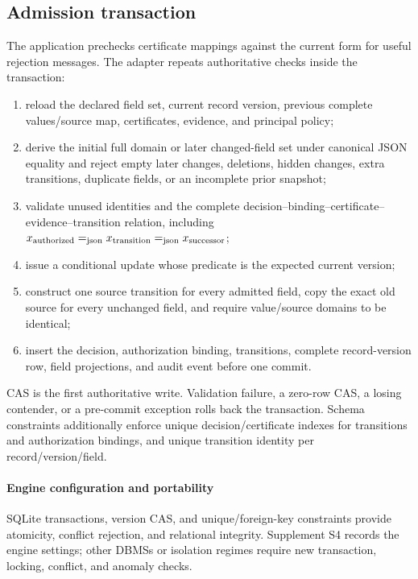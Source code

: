 \subsection{Admission transaction}

The application prechecks certificate mappings against the current form for useful rejection messages. The adapter repeats authoritative checks inside the transaction:

\begin{enumerate}[leftmargin=*]
  \item reload the declared field set, current record version, previous complete values/source map, certificates, evidence, and principal policy;
  \item derive the initial full domain or later changed-field set under canonical JSON equality and reject empty later changes, deletions, hidden changes, extra transitions, duplicate fields, or an incomplete prior snapshot;
  \item validate unused identities and the complete decision--binding--certificate--evidence--transition relation, including
  $x_{\mathrm{authorized}}\mathrel{=_{\mathrm{json}}} x_{\mathrm{transition}}\mathrel{=_{\mathrm{json}}} x_{\mathrm{successor}}$;
  \item issue a conditional update whose predicate is the expected current version;
  \item construct one source transition for every admitted field, copy the exact old source for every unchanged field, and require value/source domains to be identical;
  \item insert the decision, authorization binding, transitions, complete record-version row, field projections, and audit event before one commit.
\end{enumerate}

CAS is the first authoritative write. Validation failure, a zero-row CAS, a losing contender, or a pre-commit exception rolls back the transaction. Schema constraints additionally enforce unique decision/certificate indexes for transitions and authorization bindings, and unique transition identity per record/version/field.

\paragraph{Engine configuration and portability}
SQLite transactions, version CAS, and unique/foreign-key constraints provide atomicity, conflict rejection, and relational integrity. Supplement S4 records the engine settings; other DBMSs or isolation regimes require new transaction, locking, conflict, and anomaly checks.

